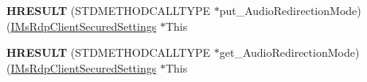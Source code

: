 \begin{DoxyCompactItemize}
\item 
\mbox{\label{struct_m_s_t_s_c_lib_1_1_i_ms_rdp_client_secured_settings_vtbl_ac3ddeed6f17b888c5ff325f8722afe38}} 
{\bfseries H\+R\+E\+S\+U\+LT} (S\+T\+D\+M\+E\+T\+H\+O\+D\+C\+A\+L\+L\+T\+Y\+PE $\ast$put\+\_\+\+Audio\+Redirection\+Mode)(\hyperlink{interface_m_s_t_s_c_lib_1_1_i_ms_rdp_client_secured_settings}{I\+Ms\+Rdp\+Client\+Secured\+Settings} $\ast$This
\item 
\mbox{\label{struct_m_s_t_s_c_lib_1_1_i_ms_rdp_client_secured_settings_vtbl_a639f6942160aeaff11f84bb3e4691007}} 
{\bfseries H\+R\+E\+S\+U\+LT} (S\+T\+D\+M\+E\+T\+H\+O\+D\+C\+A\+L\+L\+T\+Y\+PE $\ast$get\+\_\+\+Audio\+Redirection\+Mode)(\hyperlink{interface_m_s_t_s_c_lib_1_1_i_ms_rdp_client_secured_settings}{I\+Ms\+Rdp\+Client\+Secured\+Settings} $\ast$This
\end{DoxyCompactItemize}
